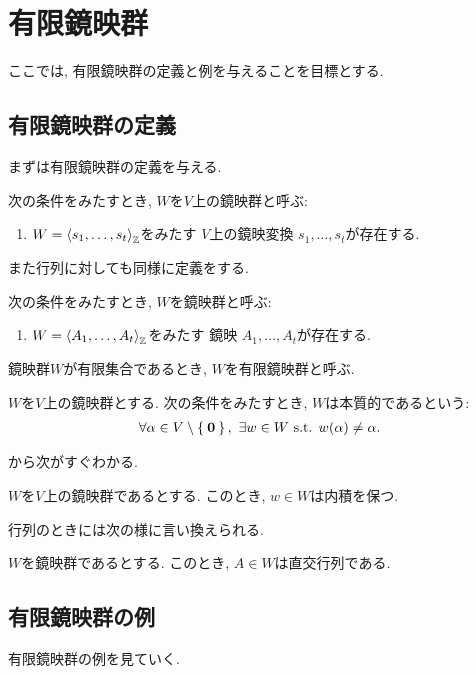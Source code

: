 \chapter{有限鏡映群}
ここでは,
有限鏡映群の定義と例を与えることを目標とする.
\section{有限鏡映群の定義}
まずは有限鏡映群の定義を与える.
\begin{definition}
  次の条件をみたすとき, 
  $W$を$V$上の鏡映群と呼ぶ:
  \begin{enumerate}
  \item
    $W=\Braket{s_1,\ldots,s_t}_{\mathbb{Z}}$をみたす
    $V$上の鏡映変換
    $s_1,\ldots,s_t$が存在する.
  \end{enumerate}
\end{definition}

また行列に対しても同様に定義をする.
\begin{definition}
  次の条件をみたすとき, 
  $W$を鏡映群と呼ぶ:
  \begin{enumerate}
  \item
    $W=\Braket{A_1,\ldots,A_t}_{\mathbb{Z}}$をみたす
    鏡映
    $A_1,\ldots,A_t$が存在する.
  \end{enumerate}
\end{definition}
鏡映群$W$が有限集合であるとき,
$W$を有限鏡映群と呼ぶ.

\begin{definition}
  $W$を$V$上の鏡映群とする.
  次の条件をみたすとき, 
  $W$は本質的であるという:
  \begin{align*}
    \forall \alpha\in V\setminus\Set{\zzero},\ 
    \exists w\in W
    \text{ s.t. }
    w(\alpha)\neq \alpha.
  \end{align*}
\end{definition}

から次がすぐわかる.
\begin{prop}
\label{prop:reflgrpisortho}
  $W$を$V$上の鏡映群であるとする.
  このとき, $w\in W$は内積を保つ.
\end{prop}

行列のときには次の様に言い換えられる.
\begin{prop}
  $W$を鏡映群であるとする.
  このとき, $A \in W$は直交行列である.
\end{prop}

\section{有限鏡映群の例}
有限鏡映群の例を見ていく.
